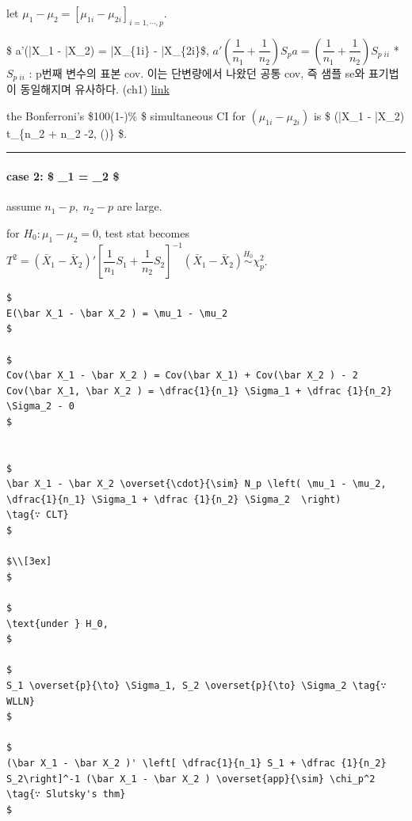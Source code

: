 \documentclass[
]{book}
\begin{document}
{{{let \(\mu_1 - \mu_2 = \left[ \mu_{1i} - \mu_{2i} \right]_{i=1,\cdots,p}\).

\$ a'(\bar X\_1 - \bar X\_2) = \bar X\_\{1i\} - \bar X\_\{2i\}\$, \(a' \left( \dfrac {1}{n_1} + \dfrac {1}{n_2} \right) S_p a = \left( \dfrac {1}{n_1} + \dfrac {1}{n_2} \right) S_{p \; ii}\)
* \(S_{p \; ii}\) : p번째 변수의 표본 cov. 이는 단변량에서 나왔던 공통 cov, 즉 샘플 se와 표기법이 동일해지며 유사하다. (ch1) \href{}{link}

the Bonferroni's \$100(1-\alpha)\% \$ simultaneous CI for \((\mu_{1i} - \mu_{2i})\) is \$ (\bar X\_1 - \bar X\_2) \pm t\_\{n\_2 + n\_2 -2, ()\} \$.

\begin{center}\rule{0.5\linewidth}{0.5pt}\end{center}

\hypertarget{case-2-_1-_2}{%
\paragraph{\texorpdfstring{case 2: \$ \Sigma\_1 \not = \Sigma\_2 \$}{case 2: \$ \_1 = \_2 \$}}\label{case-2-_1-_2}}

assume \(n_1 - p , \; n_2 - p\) are large.

for \(H_0 : \mu_1 - \mu_2 = 0\), test stat becomes \(T^2 = (\bar X_1 - \bar X_2 )' \left[ \dfrac{1}{n_1} S_1 + \dfrac {1}{n_2} S_2 \right]^{-1} (\bar X_1 - \bar X_2 ) \overset{H_0}{\sim} \chi_p^2\).

\begin{verbatim}
$
E(\bar X_1 - \bar X_2 ) = \mu_1 - \mu_2
$

$
Cov(\bar X_1 - \bar X_2 ) = Cov(\bar X_1) + Cov(\bar X_2 ) - 2 Cov(\bar X_1, \bar X_2 ) = \dfrac{1}{n_1} \Sigma_1 + \dfrac {1}{n_2} \Sigma_2 - 0
$


$
\bar X_1 - \bar X_2 \overset{\cdot}{\sim} N_p \left( \mu_1 - \mu_2, \dfrac{1}{n_1} \Sigma_1 + \dfrac {1}{n_2} \Sigma_2  \right)
\tag{∵ CLT}
$

$\\[3ex]
$

$
\text{under } H_0, 
$

$
S_1 \overset{p}{\to} \Sigma_1, S_2 \overset{p}{\to} \Sigma_2 \tag{∵ WLLN}
$

$
(\bar X_1 - \bar X_2 )' \left[ \dfrac{1}{n_1} S_1 + \dfrac {1}{n_2} S_2\right]^-1 (\bar X_1 - \bar X_2 ) \overset{app}{\sim} \chi_p^2 \tag{∵ Slutsky's thm}
$
\end{verbatim}

}}}
\end{document}
